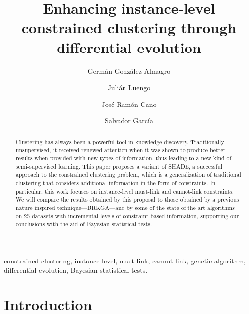 \documentclass[review]{elsarticle}
\begin{document}
\begin{frontmatter}

\title{Enhancing instance-level constrained clustering through differential evolution}

\author[mymainaddress]{Germ\'an Gonz\'alez-Almagro}

\author[mymainaddress]{Juli\'an Luengo}

\author[mysecondaddress]{Jos\'e-Ram\'on Cano}

\author[mymainaddress]{Salvador Garc\'ia}

\address[mymainaddress]{DaSCI Andalusian Institute of Data Science and Computational Intelligence, University of Granada, Spain}

\address[mysecondaddress]{Dept. of Computer Science, EPS of Linares, University of Ja\'en, Campus Cient\'ifico Tecnol\'ogico de Linares, Cintur\'on Sur S/N, Linares 23700, Ja\'en, Spain}

\begin{abstract}
Clustering has always been a powerful tool in knowledge discovery. Traditionally unsupervised, it received renewed attention when it was shown to produce better results when provided with new types of information, thus leading to a new kind of semi-supervised learning. This paper proposes a variant of SHADE, a successful approach to the constrained clustering problem, which is a generalization of traditional clustering that considers additional information in the form of constraints. In particular, this work focuses on instance-level must-link and cannot-link constraints. We will compare the results obtained by this proposal to those obtained by a previous nature-inspired technique---BRKGA---and by some of the state-of-the-art algorithms on 25 datasets with incremental levels of constraint-based information, supporting our conclusions with the aid of Bayesian statistical tests.
\end{abstract}

\begin{keyword}
constrained clustering, instance-level, must-link, cannot-link, genetic algorithm, differential evolution, Bayesian statistical tests.
\end{keyword}

\end{frontmatter}

\linenumbers

\section{Introduction} \label{sec:Intro}
\end{document}
